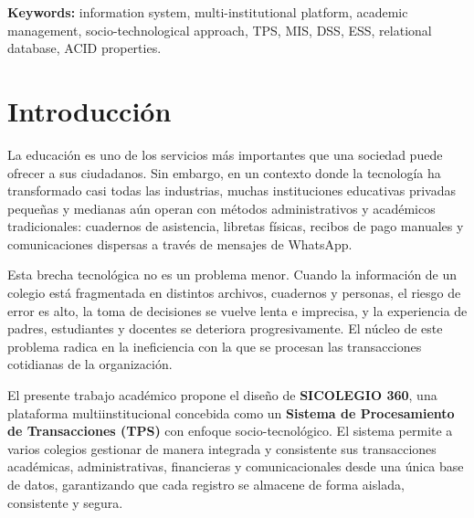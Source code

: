 \documentclass[12pt,a4paper,oneside]{report}
\begin{document}
\textbf{Keywords:} information system, multi-institutional platform, academic management, socio-technological approach, TPS, MIS, DSS, ESS, relational database, ACID properties.

\newpage 
\tableofcontents
\newpage
\listoftables
\newpage
\listoffigures

\chapter*{Introducción}

La educación es uno de los servicios más importantes que una sociedad puede ofrecer a sus ciudadanos. Sin embargo, en un contexto donde la tecnología ha transformado casi todas las industrias, muchas instituciones educativas privadas pequeñas y medianas aún operan con métodos administrativos y académicos tradicionales: cuadernos de asistencia, libretas físicas, recibos de pago manuales y comunicaciones dispersas a través de mensajes de WhatsApp.

Esta brecha tecnológica no es un problema menor. Cuando la información de un colegio está fragmentada en distintos archivos, cuadernos y personas, el riesgo de error es alto, la toma de decisiones se vuelve lenta e imprecisa, y la experiencia de padres, estudiantes y docentes se deteriora progresivamente. El núcleo de este problema radica en la ineficiencia con la que se procesan las transacciones cotidianas de la organización.

El presente trabajo académico propone el diseño de \textbf{SICOLEGIO 360}, una plataforma multiinstitucional concebida como un \textbf{Sistema de Procesamiento de Transacciones (TPS)} con enfoque socio-tecnológico. El sistema permite a varios colegios gestionar de manera integrada y consistente sus transacciones académicas, administrativas, financieras y comunicacionales desde una única base de datos, garantizando que cada registro se almacene de forma aislada, consistente y segura.
\end{document}
